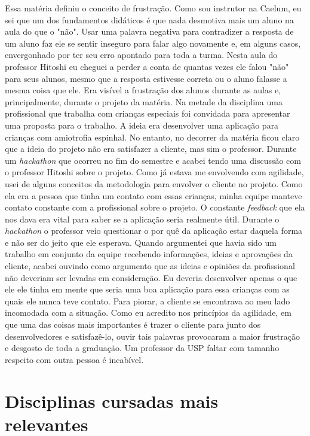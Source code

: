 \documentclass[titlepage,a4paper]{article}
\begin{document}
\begin{itemize}
{	Essa matéria definiu o conceito de frustração. Como sou instrutor na Caelum, eu sei que um dos fundamentos didáticos é que nada desmotiva mais um aluno na aula do que o "não". Usar uma palavra negativa para contradizer a resposta de um aluno faz ele se sentir inseguro para falar algo novamente e, em alguns casos, envergonhado por ter seu erro apontado para toda a turma. Nesta aula do professor Hitoshi eu cheguei a perder a conta de quantas vezes ele falou "não" para seus alunos, mesmo que a resposta estivesse correta ou o aluno falasse a mesma coisa que ele. Era visível a frustração dos alunos durante as aulas e, principalmente, durante o projeto da matéria. 
	\newline
	Na metade da disciplina uma profissional que trabalha com crianças especiais foi convidada para apresentar uma proposta para o trabalho. A ideia era desenvolver uma aplicação para crianças com amiotrofia espinhal. No entanto, no decorrer da matéria ficou claro que a ideia do projeto não era satisfazer a cliente, mas sim o professor. Durante um \textit{hackathon} que ocorreu no fim do semestre e acabei tendo uma discussão com o professor Hitoshi sobre o projeto. Como já estava me envolvendo com agilidade, usei de alguns conceitos da metodologia para envolver o cliente no projeto. Como ela era a pessoa que tinha um contato com essas crianças, minha equipe manteve contato constante com a profissional sobre o projeto. O constante \textit{feedback} que ela nos dava era vital para saber se a aplicação seria realmente útil.
	\newline
	Durante o \textit{hackathon} o professor veio questionar o por quê da aplicação estar daquela forma e não ser do jeito que ele esperava. Quando argumentei que havia sido um trabalho em conjunto da equipe recebendo informações, ideias e aprovações da cliente, acabei ouvindo como argumento que as ideias e opiniões da profissional não deveriam ser levadas em consideração. Eu deveria desenvolver apenas o que ele ele tinha em mente que seria uma boa aplicação para essa crianças com as quais ele nunca teve contato. Para piorar, a cliente se encontrava ao meu lado incomodada com a situação. Como eu acredito nos princípios da agilidade, em que uma das coisas mais importantes é trazer o cliente para junto dos desenvolvedores e satisfazê-lo, ouvir tais palavras provocaram a maior frustração e desgosto de toda a graduação. Um professor da USP faltar com tamanho respeito com outra pessoa é incabível.}
\end{itemize}

\section{Disciplinas cursadas mais relevantes}
\end{document}
